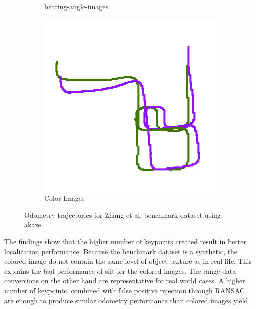 \begin{figure}[htp]
\begin{subfigure}[c]{0.31\linewidth}
    \caption{\glspl{bearing-angle-image}}
\end{subfigure}%
\begin{subfigure}[c]{0.31\linewidth}
    \includegraphics[width=\linewidth]{chapter06/odo/zhang_pinhole_AKAZE_nice.png}%
    \caption{Color Images}
\end{subfigure}
\caption{Odometry trajectories for Zhang et al.\cite{zhang_icra2016} benchmark dataset using \acrshort{akaze}.}\label{fig:akaze_odometry}
\end{figure}
The findings show that the higher number of keypoints created result in better localization performance.
Because the benchmark dataset is a synthetic, the colored image do not contain the same level of object texture as in real life.
This explains the bad performance of \acrshort{sift} for the colored images.
The range data conversions on the other hand are representative for real world cases.
A higher number of keypoints, combined with false positive rejection through \acrshort{RANSAC} are enough to produce similar odometry performance than colored images yield.
